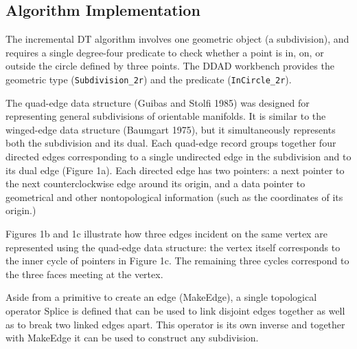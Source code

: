 
\subsection{Algorithm Implementation}

The incremental DT algorithm involves one geometric object (a subdivision), and
requires a single degree-four predicate to check whether a point is in, on, or
outside the circle defined by three points. The DDAD workbench provides the
geometric type (\texttt{Subdivision\_2r}) and the predicate
(\texttt{InCircle\_2r}). 

The quad-edge data structure (Guibas and Stolfi 1985) was designed for
representing general subdivisions of orientable manifolds. It is similar to the
winged-edge data structure (Baumgart 1975), but it simultaneously represents
both the subdivision and its dual. Each quad-edge record groups together four
directed edges corresponding to a single undirected edge in the subdivision and
to its dual edge (Figure 1a). Each directed edge has two pointers: a next
pointer to the next counterclockwise edge around its origin, and a data pointer
to geometrical and other nontopological information (such as the coordinates of
its origin.) 

Figures 1b and 1c illustrate how three edges incident on the same
vertex are represented using the quad-edge data structure: the vertex itself
corresponds to the inner cycle of pointers in Figure 1c. The remaining three
cycles correspond to the three faces meeting at the vertex.

Aside from a primitive to create an edge (MakeEdge), a single topological
operator Splice is defined that can be used to link disjoint edges together as
well as to break two linked edges apart. This operator is its own inverse and
together with MakeEdge it can be used to construct any subdivision.

